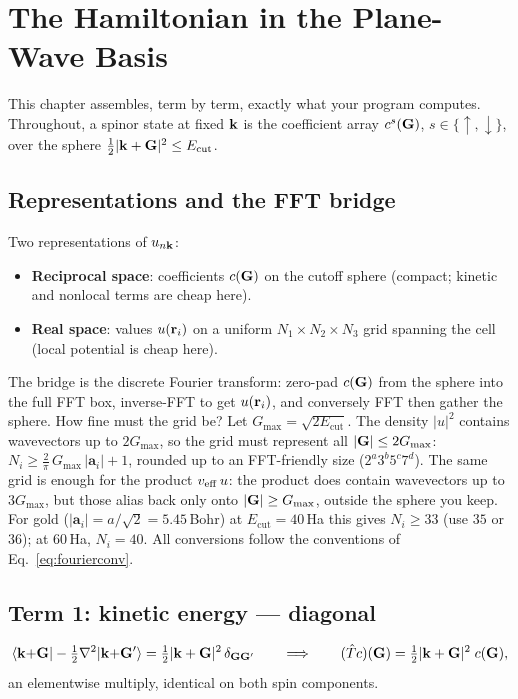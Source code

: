 \chapter{The Hamiltonian in the Plane-Wave Basis}
\label{ch:hamiltonian}

This chapter assembles, term by term, exactly what your program computes.
Throughout, a spinor state at fixed $\mathbf{k}$ is the coefficient array
$c^{s}(\mathbf{G})$, $s \in \{\uparrow,\downarrow\}$, over the sphere
$\tfrac12|\mathbf{k}+\mathbf{G}|^2 \le E_{\mathrm{cut}}$.

\section{Representations and the FFT bridge}

Two representations of $u_{n\mathbf{k}}$:
\begin{itemize}[leftmargin=2em]
\item \textbf{Reciprocal space}: coefficients $c(\mathbf{G})$ on the cutoff sphere
(compact; kinetic and nonlocal terms are cheap here).
\item \textbf{Real space}: values $u(\mathbf{r}_i)$ on a uniform $N_1{\times}N_2
{\times}N_3$ grid spanning the cell (local potential is cheap here).
\end{itemize}
The bridge is the discrete Fourier transform: zero-pad $c(\mathbf{G})$ from the
sphere into the full FFT box, inverse-FFT to get $u(\mathbf{r}_i)$, and conversely
FFT then gather the sphere. How fine must the grid be? Let $G_{\max} = \sqrt{2E_{\mathrm{cut}}}$. The
density $|u|^2$ contains wavevectors up to $2G_{\max}$, so the grid must
represent all $|\mathbf{G}| \le 2G_{\max}$:
$N_i \ge \tfrac{2}{\pi}\, G_{\max}\, |\mathbf a_i| + 1$,
rounded up to an FFT-friendly size ($2^a 3^b 5^c 7^d$). The same grid is
enough for the product $v_{\mathrm{eff}}\, u$: the product does contain wavevectors up
to $3G_{\max}$, but those alias back only onto $|\mathbf{G}| \ge G_{\max}$,
outside the sphere you keep. For gold ($|\mathbf a_i| = a/\sqrt2 =
5.45$\,Bohr) at $E_{\mathrm{cut}} = 40$\,Ha this gives $N_i \ge 33$ (use
$35$ or $36$); at $60$\,Ha, $N_i = 40$. All conversions
follow the conventions of Eq.~\eqref{eq:fourierconv}.

\section{Term 1: kinetic energy --- diagonal}

\begin{equation}
\braket{\mathbf{k}{+}\mathbf{G} | -\tfrac12\nabla^2 | \mathbf{k}{+}\mathbf{G}'}
= \tfrac12 |\mathbf{k} + \mathbf{G}|^2\, \delta_{\mathbf{G}\mathbf{G}'}
\qquad\Longrightarrow\qquad
(\hat T c)(\mathbf{G}) = \tfrac12 |\mathbf{k}+\mathbf{G}|^2\; c(\mathbf{G}),
\end{equation}
an elementwise multiply, identical on both spin components.

